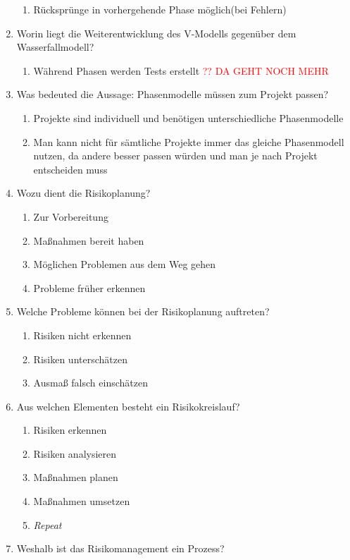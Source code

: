 \documentclass[12pt,a4paper]{article}
\begin{document}
\begin{enumerate}
\begin{enumerate}
		\item Rücksprünge in vorhergehende Phase möglich(bei Fehlern)
	\end{enumerate}
	\item Worin liegt die Weiterentwicklung des V-Modells gegenüber dem Wasserfallmodell?
	\begin{enumerate}
		\item Während Phasen werden Tests erstellt \textcolor{red}{?? DA GEHT NOCH MEHR}
	\end{enumerate}
	\item Was bedeuted die Aussage: Phasenmodelle müssen zum Projekt passen?
	\begin{enumerate}
		\item Projekte sind individuell und benötigen unterschiedliche Phasenmodelle
		\item Man kann nicht für sämtliche Projekte immer das gleiche Phasenmodell nutzen, da andere besser passen würden und man je nach Projekt entscheiden muss
	\end{enumerate}
	\item Wozu dient die Risikoplanung?
	\begin{enumerate}
		\item Zur Vorbereitung
		\item Maßnahmen bereit haben
		\item Möglichen Problemen aus dem Weg gehen
		\item Probleme früher erkennen
	\end{enumerate}
	\item Welche Probleme können bei der Risikoplanung auftreten?
	\begin{enumerate}
		\item Risiken nicht erkennen
		\item Risiken unterschätzen
		\item Ausmaß falsch einschätzen
	\end{enumerate}
	\item Aus welchen Elementen besteht ein Risikokreislauf?
	\begin{enumerate}
		\item Risiken erkennen
		\item Risiken analysieren
		\item Maßnahmen planen 
		\item Maßnahmen umsetzen
		\item \textit{Repeat}
	\end{enumerate}
	\item Weshalb ist das Risikomanagement ein Prozess?

\end{enumerate}
\end{document}

